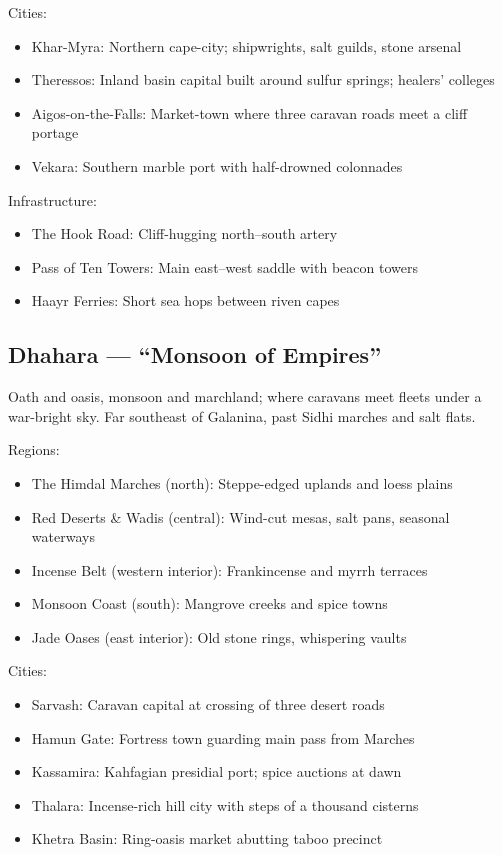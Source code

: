 Cities:
\begin{itemize}
    \item Khar-Myra: Northern cape-city; shipwrights, salt guilds, stone arsenal
    \item Theressos: Inland basin capital built around sulfur springs; healers' colleges
    \item Aigos-on-the-Falls: Market-town where three caravan roads meet a cliff portage
    \item Vekara: Southern marble port with half-drowned colonnades
\end{itemize}

Infrastructure:
\begin{itemize}
    \item The Hook Road: Cliff-hugging north--south artery
    \item Pass of Ten Towers: Main east--west saddle with beacon towers
    \item Haayr Ferries: Short sea hops between riven capes
\end{itemize}

\subsection{Dhahara --- ``Monsoon of Empires''}
\label{sec:dhahara}

Oath and oasis, monsoon and marchland; where caravans meet fleets under a war-bright sky. Far southeast of Galanina, past Sidhi marches and salt flats.

Regions:
\begin{itemize}
    \item The Himdal Marches (north): Steppe-edged uplands and loess plains
    \item Red Deserts \& Wadis (central): Wind-cut mesas, salt pans, seasonal waterways
    \item Incense Belt (western interior): Frankincense and myrrh terraces
    \item Monsoon Coast (south): Mangrove creeks and spice towns
    \item Jade Oases (east interior): Old stone rings, whispering vaults
\end{itemize}

Cities:
\begin{itemize}
    \item Sarvash: Caravan capital at crossing of three desert roads
    \item Hamun Gate: Fortress town guarding main pass from Marches
    \item Kassamira: Kahfagian presidial port; spice auctions at dawn
    \item Thalara: Incense-rich hill city with steps of a thousand cisterns
    \item Khetra Basin: Ring-oasis market abutting taboo precinct
\end{itemize}

